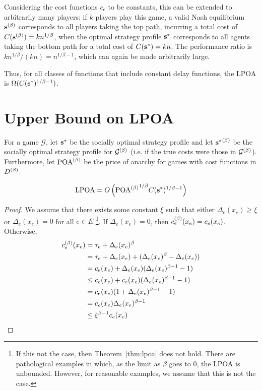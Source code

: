 \documentclass[twoside]{article}
\begin{document}
\begin{multicols}{2}
Considering the cost functions $c_e$ to be constants, this can be extended to
arbitrarily many players: if $k$ players play this game, a valid Nash
equilibrium $\mathbf{s}^{(\beta)}$ corresponds to all players taking the top path, incurring
a total cost of $C(\mathbf{s}^{(\beta)}) = kn^{1/\beta}$, when the optimal strategy profile
$\mathbf{s}^*$ corresponds to all agents taking the bottom path for a total cost of
$C(\mathbf{s}^*) = kn$. The performance ratio is $kn^{1/\beta}/(kn) = n^{1/\beta-1}$,
which can again be made arbitrarily large.

Thus, for all classes of functions that include constant delay functions, the
LPOA is $\Omega(C(\mathbf{s}^*)^{1/\beta-1})$.

\section{Upper Bound on LPOA} \label{sec:ub}
For a game $\mathcal{G}$, let $\mathbf{s}^*$ be the socially optimal strategy profile
and let ${\mathbf{s}^*}^{(\beta)}$ be the socially optimal strategy profile for
$\mathcal{G}^{(\beta)}$ (i.e. if the true costs were those in $\mathcal{G}^{(\beta)}$).
Furthermore, let $\text{POA}^{(\beta)}$ be the price of anarchy for games with cost functions in
$D^{(\beta)}$.
\begin{thm} \label{thm:lpoa}
  \[
    \text{LPOA} = O\left({\text{POA}^{(\beta)}}^{1/\beta} C(\mathbf{s}^*)^{1/\beta-1}\right)
  \]
\end{thm}
\begin{proof}
  We assume that there exists some constant $\xi$ such that either
  $\Delta_e(x_e) \ge \xi$ or $\Delta_e(x_e) = 0$ for all $e \in E$
  \footnote{If this not the case, then Theorem~\ref{thm:lpoa} does not hold.
  There are pathological examples in which, as the limit as $\beta$ goes to 0,
  the LPOA is unbounded. However, for reasonable examples, we assume that this
  is not the case.}. If $\Delta_e(x_e) = 0$, then $c_e^{(\beta)}(x_e) = c_e(x_e)$.
  Otherwise,
  \begin{align*}
    c_e\pbet(x_e) &= \tau_e + \Delta_e(x_e)^\beta \\
    &= \tau_e + \Delta_e(x_e) + (\Delta_e(x_e)^\beta - \Delta_e(x_e)) \\
    &= c_e(x_e) + \Delta_e(x_e)(\Delta_e(x_e)^{\beta-1} - 1) \\
    &\le c_e(x_e) + c_e(x_e)(\Delta_e(x_e)^{\beta-1} - 1) \\
    &= c_e(x_e) (1 + \Delta_e(x_e)^{\beta-1}-1) \\
    &= c_e(x_e) \Delta_e(x_e)^{\beta-1} \\
    &\le \xi^{\beta-1} c_e(x_e)

\end{align*}
\end{proof}
\end{multicols}
\end{document}

